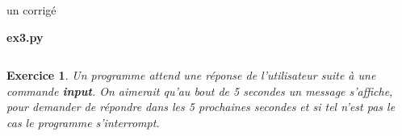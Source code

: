 \documentclass[9pt]{beamer}
\newenvironment{code}[1]{%
    \begin{bclogo}[couleur=backcolour, couleurTexte=black ,couleurBord=bleulapis ,couleurBarre=black, ombre=false,epBord=0.9,logo=\#,arrondi=0.1]{{\bfseries #1}}%
    }%
    {%
    \end{bclogo}
}%
\newtheorem{exercise}{Exercice}
\begin{document}
\begin{frame}{un corrigé}
\begin{code}{ex3.py}
    \inputminted[fontsize=\small]{Python}{ex3.py}
\end{code}
\end{frame}

\begin{frame}
\begin{exercise}
Un programme attend une réponse de l'utilisateur suite à une commande \textbf{input}. On aimerait qu'au bout de 5 secondes un message s'affiche, pour demander de répondre dans les 5 prochaines secondes et si tel n'est pas le cas le programme s'interrompt.
\end{exercise}
\end{frame}
\end{document}
